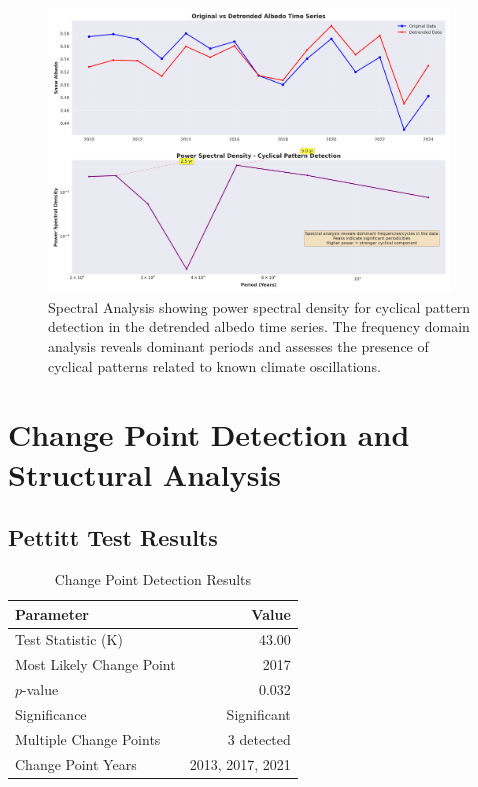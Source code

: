 \documentclass[12pt,a4paper]{article}
\newcommand{\pvalue}{$p$-value}
\begin{document}
\begin{figure}[H]
\centering
\includegraphics[width=0.95\textwidth]{advanced_plots/spectral_analysis.png}
\caption{Spectral Analysis showing power spectral density for cyclical pattern detection in the detrended albedo time series. The frequency domain analysis reveals dominant periods and assesses the presence of cyclical patterns related to known climate oscillations.}
\label{fig:spectral_analysis}
\end{figure}

\section{Change Point Detection and Structural Analysis}

\subsection{Pettitt Test Results}

\begin{table}[H]
\centering
\caption{Change Point Detection Results}
\label{tab:change_points}
\begin{tabular}{@{}lr@{}}
\toprule
\textbf{Parameter} & \textbf{Value} \\
\midrule
Test Statistic (K) & 43.00 \\
Most Likely Change Point & 2017 \\
\pvalue & 0.032 \\
Significance & Significant \\
Multiple Change Points & 3 detected \\
Change Point Years & 2013, 2017, 2021 \\
\bottomrule
\end{tabular}
\end{table}
\end{document}
